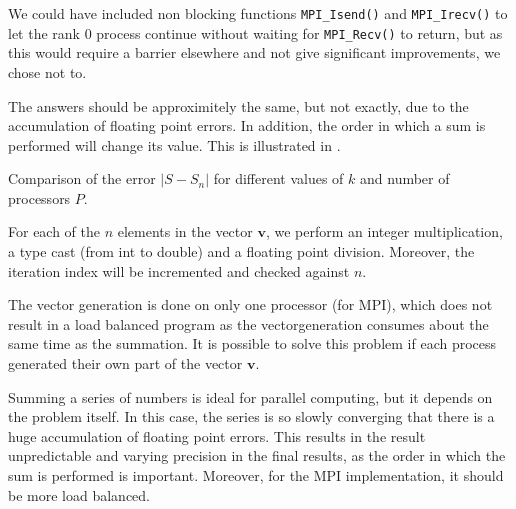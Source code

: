 \documentclass{article}
\begin{document}
We could have included non blocking functions \lstinline$MPI_Isend()$ and \lstinline$MPI_Irecv()$ to let the rank 0 process continue without waiting for \lstinline$MPI_Recv()$ to return, but as this would require a barrier elsewhere and not give significant improvements, we chose not to.

The answers should be approximitely the same, but not exactly, due to the accumulation of floating point errors. In addition, the order in which a sum is performed will change its value. This is illustrated in .

\begin{table}
	\centering
	\caption{Comparison of the error $|S-S_n|$ for different values of $k$ and number of processors $P$.}
	\label{Tab:tab2}
\end{table}


For each of the $n$ elements in the vector $\boldsymbol{v}$, we perform an integer multiplication, a type cast (from int to double) and a floating point division. Moreover, the iteration index will be incremented and checked against $n$.

The vector generation is done on only one processor (for MPI), which does not result in a load balanced program as the vectorgeneration consumes about the same time as the summation. It is possible to solve this problem if each process generated their own part of the vector $\boldsymbol{v}$. %

Summing a series of numbers is ideal for parallel computing, but it depends on the problem itself. In this case, the series is so slowly converging that there is a huge accumulation of floating point errors. This results in the result unpredictable and varying precision in the final results, as the order in which the sum is performed is important. Moreover, for the MPI implementation, it should be more load balanced.

\end{document}
